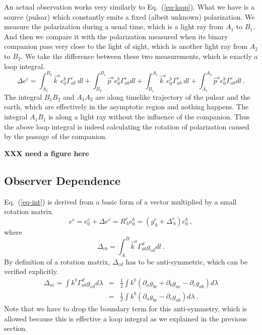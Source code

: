 \documentclass[aps,showpacs,onecolumn,floats,prd,superscriptaddress,nofootinbib]{revtex4}
\begin{document}
An actual observation works very similarly to Eq.~(\ref{eq-loop}). What we have is a source (pulsar) which constantly emits a fixed (albeit unknown) polarization. We measure the polarization during a usual time, which is a light ray from $A_1$ to $B_1$. And then we compare it with the polarization measured when its binary companion pass very close to the light of sight, which is another light ray from $A_2$ to $B_2$. We take the difference between these two measurements, which is exactly a loop integral.
\begin{equation}
\Delta e^c = \int_{A_2}^{B_2} \hat{k}^a e_0^b \Gamma_{ab}^c~dl +
\int_{B_2}^{B_1} \hat{p}^a e_0^b \Gamma_{ab}^c dl +
\int_{B_1}^{A_1} \hat{k}^a e_0^b \Gamma_{ab}^c~dl +
\int_{A_1}^{A_2} \hat{p}^a e_0^b \Gamma_{ab}^c dl~.
\label{eq-pulsar}
\end{equation}
The integral $B_1B_2$ and $A_1A_2$ are along timelike trajectory of the pulsar and the earth, which are effectively in the asymptotic region and nothing happens. The integral $A_1B_1$ is along a light ray without the influence of the companion. Thus the above loop integral is indeed calculating the rotation of polarization caused by the passage of the companion.

{\bf XXX need a figure here}

\subsection{Observer Dependence}

Eq.~(\ref{eq-int}) is derived from a basic form of a vector multiplied by a small rotation matrix.
\begin{equation}
e^c = e_0^c + \Delta e^c = R^c_{\ b} e_0^b = 
\left( g^c_{\ b} + \Delta^c_{\ b} \right) e_0^b~,
\end{equation}
where
\begin{equation}
\Delta_{cb} = \int_A^B \hat{k}^a \Gamma^d_{ab} g_{cd}dl~.
\end{equation}
By definition of a rotation matrix, $\Delta_{cd}$ has to be anti-symmetric, which can be verified explicitly.
\begin{eqnarray}
\Delta_{ac} = \int k^b\Gamma_{ab}^d g_{cd}d\lambda &=& 
\frac{1}{2} \int k^b \left(\partial_a g_{bc} + \partial_bg_{ac} - \partial_c g_{ab}\right)d\lambda
\\ \nonumber
&=& \frac{1}{2} \int k^b \left(\partial_a g_{bc} - \partial_c g_{ab}\right)d\lambda~.
\end{eqnarray}
Note that we have to drop the boundary term for this anti-symmetry, which is allowed because this is effective a loop integral as we explained in the previous section.
\end{document}
